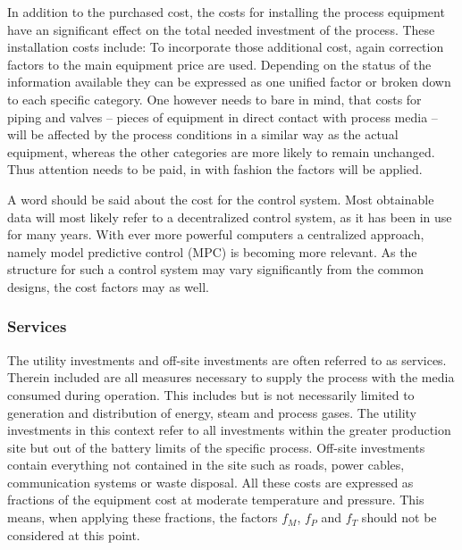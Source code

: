         In addition to the purchased cost, the costs for installing the process equipment have an significant effect
        on the total needed investment of the process. These installation costs include:
        To incorporate those additional cost, again correction factors to the main equipment price are used.
        Depending on the status
        of the information available they can be expressed as one unified factor or broken down to each specific
        category. One however needs to bare in mind, that costs for piping and valves -- pieces of equipment
        in direct contact with process media -- will be affected by the process conditions in a similar
        way as the actual equipment, whereas the other categories are more likely to remain unchanged. Thus
        attention needs to be paid, in with fashion the factors will be applied.

        A word should be said about the cost for the control system. Most obtainable data will most likely refer to
        a decentralized control system, as it has been in use for many years. With ever more powerful computers
        a centralized approach, namely model predictive control (MPC) is becoming more relevant. As the
        structure for such a control system may vary significantly from the common designs, the cost factors may
        as well.

    \subsubsection{Services}
        The utility investments and off-site investments are often referred to as services. Therein included are
        all measures necessary to supply the process with the media consumed during operation. This includes but is
        not necessarily limited to generation and distribution of energy, steam and process gases. The utility investments
        in this context refer to all investments within the greater production site but out of the battery limits of the
        specific process. Off-site investments contain everything not contained in the site such as roads, power cables,
        communication systems or waste disposal. All these costs are expressed as fractions of the equipment
        cost at moderate temperature and pressure. This means, when applying these fractions, the factors $f_M$,
        $f_P$ and $f_T$ should not be considered at this point.

